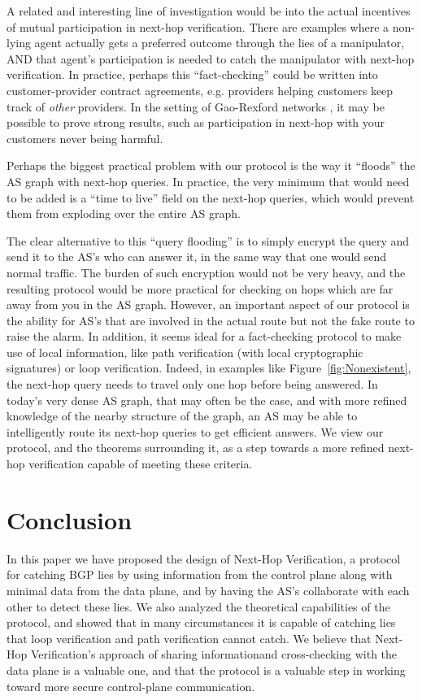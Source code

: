 \documentclass[pdftex,twoside,twocolumn,10pt,letterpaper]{article}
\begin{document}
  A related and interesting line of investigation would be into the
  actual incentives of mutual participation in next-hop verification.
  There are examples where a non-lying agent actually gets a preferred outcome
  through the lies of a manipulator, AND that agent's participation is needed to
  catch the manipulator with next-hop verification.
  In practice, perhaps this ``fact-checking'' could be written into
  customer-provider contract agreements,
  e.g. providers helping customers keep track of \emph{other} providers.
  In the setting of Gao-Rexford networks \cite{GaoRexford}, it may be possible
  to prove strong results, such as participation in next-hop with your customers
  never being harmful.

  Perhaps the biggest practical problem with our protocol
  is the way it ``floods'' the AS graph with next-hop queries.
  In practice, the very minimum that would need to be added is a
  ``time to live'' field on the next-hop queries,
  which would prevent them from exploding over the entire AS graph.

  The clear alternative to this ``query flooding'' is to simply encrypt the
  query and send it to the AS's who can answer it, in the same way that
  one would send normal traffic.
  The burden of such encryption would not be very heavy, and the
  resulting protocol would be more practical for checking on hops which
  are far away from you in the AS graph.
  However, an important aspect of our protocol is the ability for AS's that
  are involved in the actual route but not the fake route to raise the alarm.
  In addition, it seems ideal for a fact-checking protocol to make use of local
  information, like path verification (with local cryptographic signatures)
  or loop verification.
  Indeed, in examples like Figure~\ref{fig:Nonexistent}, the next-hop query
  needs to travel only one hop before being answered.
  In today's very dense AS graph, that may often be the case,
  and with more refined knowledge of the nearby structure of the graph,
  an AS may be able to intelligently route its next-hop queries to get efficient
  answers. We view our protocol, and the theorems surrounding it, as a step
  towards a more refined next-hop verification capable of meeting these
  criteria.


\section{Conclusion}
In this paper we have proposed the design of Next-Hop Verification, a protocol for catching BGP lies by using information from the control plane along with minimal data from the data plane, and by having the AS's collaborate with each other to detect these lies. We also analyzed the theoretical capabilities of the protocol, and showed that in many circumstances it is capable of catching lies that loop verification and path verification cannot catch. We believe that Next-Hop Verification's approach of sharing informationand cross-checking with the data plane is a valuable one, and that the protocol is a valuable step in working toward more secure control-plane communication.


{}


\clearpage
\end{document}
